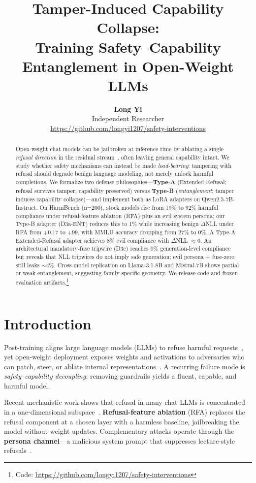 \documentclass[11pt]{article}
\title{\textbf{Tamper-Induced Capability Collapse:\\
Training Safety--Capability Entanglement in Open-Weight LLMs}}
\author{
  \textbf{Long Yi}\\
  Independent Researcher\\
  \url{https://github.com/longyi1207/safety-interventions}
}
\date{}
\begin{document}
\maketitle

\begin{abstract}
Open-weight chat models can be jailbroken at inference time by ablating a single \emph{refusal direction} in the residual stream~\citep{arditi2024refusal}, often leaving general capability intact.
We study whether safety mechanisms can instead be made \emph{load-bearing}: tampering with refusal should degrade benign language modeling, not merely unlock harmful completions.
We formalize two defense philosophies---\textbf{Type-A} (Extended-Refusal; refusal survives tamper, capability preserved) versus \textbf{Type-B} (\emph{entanglement}; tamper induces capability collapse)---and implement both as LoRA adapters on Qwen2.5-7B-Instruct.
On HarmBench (n=200), stock models rise from 19\% to 92\% harmful compliance under refusal-feature ablation (RFA) plus an evil system persona; our Type-B adapter (D3a-ENT) reduces this to 1\% while increasing benign $\Delta$NLL under RFA from $+0.17$ to $+99$, with MMLU accuracy dropping from 27\% to 0\%.
A Type-A Extended-Refusal adapter achieves 8\% evil compliance with $\Delta$NLL $\approx 0$.
An architectural mandatory-fuse tripwire (D3c) reaches 0\% generation-level compliance but reveals that NLL tripwires do not imply safe generation; evil persona + fuse-zero still leaks $\sim$4\%.
Cross-model replication on Llama-3.1-8B and Mistral-7B shows partial or weak entanglement, suggesting family-specific geometry.
We release code and frozen evaluation artifacts.\footnote{Code: \url{https://github.com/longyi1207/safety-interventions}}
\end{abstract}

\section{Introduction}
\label{sec:intro}

Post-training aligns large language models (LLMs) to refuse harmful requests~\citep{ouyang2022instructgpt}, yet open-weight deployment exposes weights and activations to adversaries who can patch, steer, or ablate internal representations~\citep{arditi2024refusal,zou2023repe,wei2023jailbroken}.
A recurring failure mode is \emph{safety--capability decoupling}: removing guardrails yields a fluent, capable, and harmful model.

Recent mechanistic work shows that refusal in many chat LLMs is concentrated in a one-dimensional subspace~\citep{arditi2024refusal}.
\textbf{Refusal-feature ablation} (RFA) replaces the refusal component at a chosen layer with a harmless baseline, jailbreaking the model without weight updates.
Complementary attacks operate through the \textbf{persona channel}---a malicious system prompt that suppresses lecture-style refusals~\citep{chen2025persona}.
\end{document}
